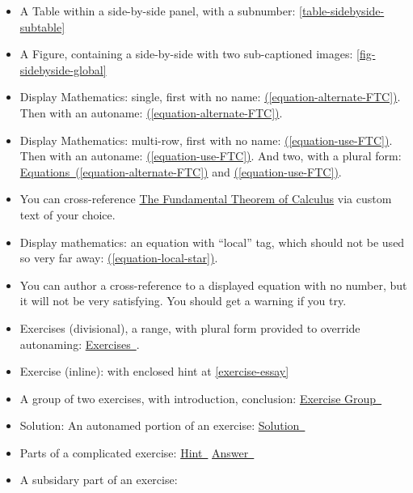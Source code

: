 \documentclass{sn-jnl}
\theoremstyle{thmstyleone}%
\theoremstyle{thmstyletwo}%
\theoremstyle{thmstylethree}%
\newcommand{\xreffont}{\relax}
\numberwithin{equation}{section}
\begin{document}
\begin{itemize}[label=\textbullet]
\item{}A Table within a side-by-side panel, with a subnumber: \hyperref[table-sidebyside-subtable]{{\xreffont\ref{table-sidebyside-subtable}}}%
\item{}A Figure, containing a side-by-side with two sub-captioned images: \hyperref[fig-sidebyside-global]{{\xreffont\ref{fig-sidebyside-global}}}%
\item{}Display Mathematics: single, first with no name: \hyperref[equation-alternate-FTC]{({\xreffont\ref{equation-alternate-FTC}})}.  Then with an autoname: \hyperref[equation-alternate-FTC]{({\xreffont\ref{equation-alternate-FTC}})}.%
\item{}Display Mathematics: multi-row, first with no name: \hyperref[equation-use-FTC]{({\xreffont\ref{equation-use-FTC}})}.  Then with an autoname: \hyperref[equation-use-FTC]{({\xreffont\ref{equation-use-FTC}})}.  And two, with a plural form: \hyperref[equation-alternate-FTC]{Equations~({\xreffont\ref{equation-alternate-FTC}})} and \hyperref[equation-use-FTC]{({\xreffont\ref{equation-use-FTC}})}.%
\item{}You can cross-reference \hyperref[equation-use-FTC]{The Fundamental Theorem of Calculus} via custom text of your choice.%
\item{}Display mathematics: an equation with  ``local'' tag, which should not be used so very far away: \hyperref[equation-local-star]{({\xreffont\ref{equation-local-star}})}.%
\item{}You can author a cross-reference to a displayed equation with no number, but it will not be very satisfying.  You should get a warning if you try.%
\item{}Exercises (divisional), a range, with plural form provided to override autonaming: \hyperlink{exercises-null-problem}{Exercises~{\xreffont 1}\textendash{}{\xreffont 2}}.%
\item{}Exercise (inline): with enclosed hint at \hyperref[exercise-essay]{{\xreffont\ref{exercise-essay}}}%
\item{}A group of two exercises, with introduction, conclusion: \hyperlink{exercisegroup-two-problems}{Exercise Group~{\xreffont 1}}%
\item{}Solution: An autonamed portion of an exercise: \hyperlink{solution-antiderivative}{Solution~{\xreffont 1}}%
\item{}Parts of a complicated exercise: \hyperlink{exercise-complicated-second-hint}{Hint~{\xreffont 2}} \hyperlink{exercise-complicated-first-answer}{Answer~{\xreffont 1}}%
\item{}A subsidary part of an exercise: \hyperlink{exercise-one-two-one}{{\xreffont 1}}%

\end{itemize}
\end{document}
